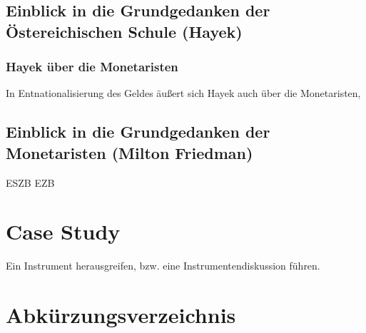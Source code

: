 \documentclass[
onecolumn,
a4paper,
abstracton,
parskip=half
,final
]{scrartcl}
\begin{document}
\subsection{Einblick in die Grundgedanken der {\"O}stereichischen Schule (Hayek)}

\subsubsection{Hayek  {\"u}ber die Monetaristen}

In Entnationalisierung des Geldes {\"a}u{\ss}ert sich Hayek auch {\"u}ber die Monetaristen, \citep[vgl.][]{Hayek1977}



\subsection{Einblick in die Grundgedanken der Monetaristen (Milton Friedman)}


\clearpage
\ac{ESZB}
\ac{EZB}



\section{Case Study}
\label{sec1:caseStudy}
Ein Instrument herausgreifen, bzw. eine Instrumentendiskussion f{\"u}hren.

\subsection{}
\subsection{}
\subsection{}











\clearpage

\section{Abk{\"u}rzungsverzeichnis}


\begin{acronym}[ESZB]





\end{acronym}
\end{document}
